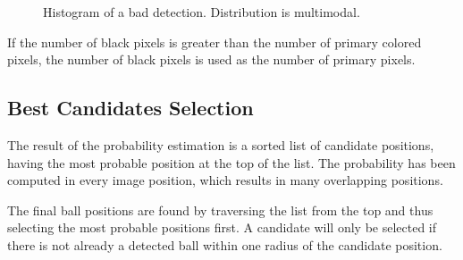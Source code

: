 \begin{figure}[htpb]
  \centering
  \quad           
   \caption{Histogram of a bad detection. Distribution is multimodal.}
  \label{fig:multimodal56}
\end{figure}


If the number of black pixels is greater than the number of primary colored pixels, the number of black pixels is used as the number of primary pixels.
\subsection{Best Candidates Selection}
The result of the probability estimation is a sorted list of candidate positions, having the most probable position at the top of the list. The probability has been computed in every image position, which results in many overlapping positions. 

The final ball positions are found by traversing the list from the top and thus selecting the most probable positions first. A candidate will only be selected if there is not already a detected ball within one radius of the candidate position.  


